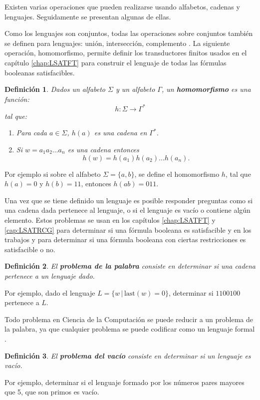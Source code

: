 \documentclass[12pt]{article}
\newtheorem{definition}{Definición}
\begin{document}
Existen varias operaciones que pueden realizarse usando alfabetos, cadenas y lenguajes. Seguidamente se presentan algunas de ellas.

Como los lenguajes son conjuntos, todas las operaciones sobre conjuntos también se definen para lenguajes: unión, intersección, complemento \cite{authomataTheory}.
La siguiente operación, homomorfismo, permite definir los transductores finitos usados en el capítulo \ref{chap:LSATFT} para 
construir el lenguaje de todas las fórmulas booleanas satisfacibles.

\begin{definition}
  Dados un alfabeto \( \Sigma \) y un alfabeto \( \Gamma \), un \textbf{homomorfismo} es una función:
  \[
    h: \Sigma \to \Gamma^*
  \]
  tal que:
  \begin{enumerate}
    \item Para cada \( a \in \Sigma \), \( h(a) \) es una cadena en \( \Gamma^* \).
    \item Si $w=a_1a_2\ldots a_n$ es una cadena entonces
          $$h(w)=h(a_1)h(a_2)\ldots h(a_n).$$
  \end{enumerate}
\end{definition}

Por ejemplo si sobre el alfabeto $\Sigma=\{a,b\}$, se define el homomorfismo $h$, tal que $h(a)=0$ y $h(b)=11$, entonces
$h(ab)=011$.


Una vez que se tiene definido un lenguaje es posible responder preguntas como si una cadena dada pertenece al lenguaje, o si el lenguaje es vacío o contiene algún elemento.
Estos problemas se usan en los capítulos \ref{chap:LSATFT} y \ref{cap:LSATRCG} para determinar si una fórmula booleana
es satisfacible y en los trabajos \cite{aCFSAT} y \cite{aSRCSAT} para determinar si una fórmula booleana con ciertas restricciones es 
satisfacible o no.

\begin{definition}
  El \textbf{problema de la palabra} consiste en determinar si una cadena pertenece a un lenguaje dado. 
\end{definition}
Por ejemplo, dado el lenguaje $L=\{w\,|\,\text{last}(w)=0\}$, determinar si $1100100$ pertenece a $L$.

Todo problema en Ciencia de la Computación se puede reducir a un problema de la palabra, ya que cualquier problema se puede codificar como un lenguaje formal \cite{authomataTheory}.

\begin{definition} 
  El \textbf{problema del vacío} consiste en determinar si un lenguaje es vacío.
\end{definition}
Por ejemplo, determinar si el lenguaje formado por los números pares mayores que 5, que son primos es vacío.
\end{document}
